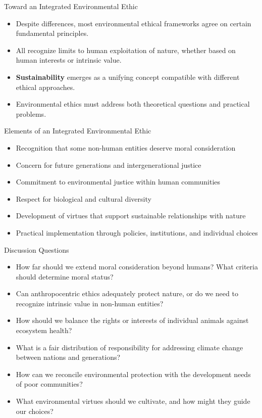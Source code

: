 \documentclass{beamer}
\begin{document}
	\begin{frame}{Toward an Integrated Environmental Ethic}
		\begin{itemize}
			\item Despite differences, most environmental ethical frameworks agree on certain fundamental principles.
			\item All recognize limits to human exploitation of nature, whether based on human interests or intrinsic value.
			\item \textbf{Sustainability} emerges as a unifying concept compatible with different ethical approaches.
			\item Environmental ethics must address both theoretical questions and practical problems.
		\end{itemize}
		
		\begin{block}{Elements of an Integrated Environmental Ethic}
			\scriptsize
			\begin{itemize}
				\item Recognition that some non-human entities deserve moral consideration
				\item Concern for future generations and intergenerational justice
				\item Commitment to environmental justice within human communities
				\item Respect for biological and cultural diversity
				\item Development of virtues that support sustainable relationships with nature
				\item Practical implementation through policies, institutions, and individual choices
			\end{itemize}
		\end{block}
	\end{frame}
	
	\begin{frame}{Discussion Questions}
		\begin{itemize}
			\item How far should we extend moral consideration beyond humans? What criteria should determine moral status?
			\item Can anthropocentric ethics adequately protect nature, or do we need to recognize intrinsic value in non-human entities?
			\item How should we balance the rights or interests of individual animals against ecosystem health?
			\item What is a fair distribution of responsibility for addressing climate change between nations and generations?
			\item How can we reconcile environmental protection with the development needs of poor communities?
			\item What environmental virtues should we cultivate, and how might they guide our choices?
		\end{itemize}

	\end{frame}
	
	
\end{document}
